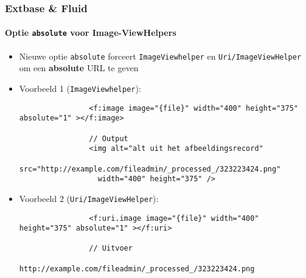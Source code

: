 \begin{frame}[fragile]
	\frametitle{Extbase \& Fluid}
	\framesubtitle{Optie \texttt{absolute} voor Image-ViewHelpers}

	\lstset{basicstyle=\tiny\ttfamily}

	\begin{itemize}

		\item Nieuwe optie \texttt{absolute} forceert \texttt{ImageViewhelper} en
			\texttt{Uri/ImageViewHelper} om een \textbf{absolute} URL te geven

		\item Voorbeeld 1 (\texttt{ImageViewhelper}):

			\begin{lstlisting}
				<f:image image="{file}" width="400" height="375" absolute="1" ></f:image>

				// Output
				<img alt="alt uit het afbeeldingsrecord"
				  src="http://example.com/fileadmin/_processed_/323223424.png"
				  width="400" height="375" />
			\end{lstlisting}

		\item Voorbeeld 2 (\texttt{Uri/ImageViewHelper}):

			\begin{lstlisting}
				<f:uri.image image="{file}" width="400" height="375" absolute="1" ></f:uri>

				// Uitvoer
				http://example.com/fileadmin/_processed_/323223424.png
			\end{lstlisting}

	\end{itemize}

\end{frame}


